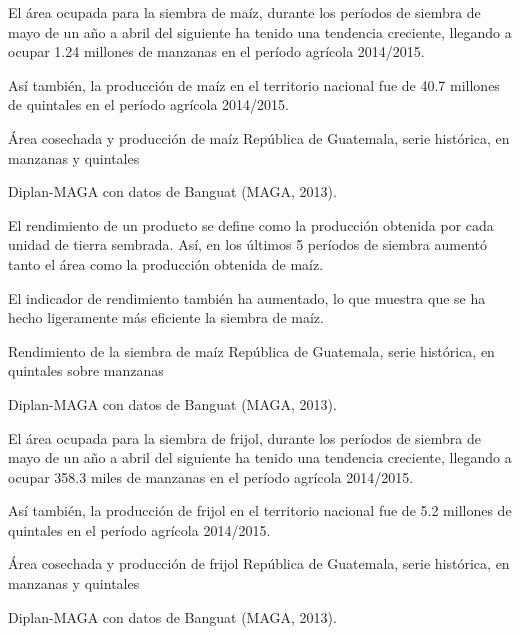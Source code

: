 
{%
El área ocupada para la siembra de maíz, durante los períodos de siembra de mayo de un año a abril del siguiente ha tenido una tendencia creciente, llegando a ocupar 1.24 millones de  manzanas en el período agrícola 2014/2015.

Así también, la producción de maíz en el territorio nacional fue de 40.7 millones de quintales en el período agrícola 2014/2015.
}%
{%
 Área cosechada y producción de maíz} %
{%
 República de Guatemala, serie histórica, en manzanas y  quintales } %
{%
 \begin{tikzpicture}[x=1pt,y=1pt]    \end{tikzpicture}}%
{%
Diplan-MAGA con datos de Banguat (MAGA, 2013).} %



%
{%
El rendimiento de un producto se define como la producción obtenida por cada unidad de tierra sembrada. Así, en los últimos 5 períodos de siembra aumentó tanto el área como la producción obtenida de maíz.

 El indicador de rendimiento también ha aumentado, lo que muestra que se ha hecho ligeramente más eficiente la siembra de maíz. 
}%
{%
	Rendimiento de la siembra de maíz } %
{%
	República de Guatemala, serie histórica, en quintales sobre manzanas } %
{%
	\begin{tikzpicture}[x=1pt,y=1pt]    \end{tikzpicture}}%
{%
	Diplan-MAGA con datos de Banguat (MAGA, 2013).} %



%
{%
El área ocupada para la siembra de frijol, durante los períodos de siembra de mayo de un año a abril del siguiente ha tenido una tendencia creciente, llegando a ocupar 358.3 miles de  manzanas en el período agrícola 2014/2015.

Así también, la producción de frijol en el territorio nacional fue de 5.2 millones de quintales en el período agrícola 2014/2015.
}%
{%
	Área cosechada y producción de frijol} %
{%
	República de Guatemala, serie histórica, en manzanas y  quintales } %
{%
	\begin{tikzpicture}[x=1pt,y=1pt]    \end{tikzpicture}}%
{%
	Diplan-MAGA con datos de Banguat (MAGA, 2013).} %

